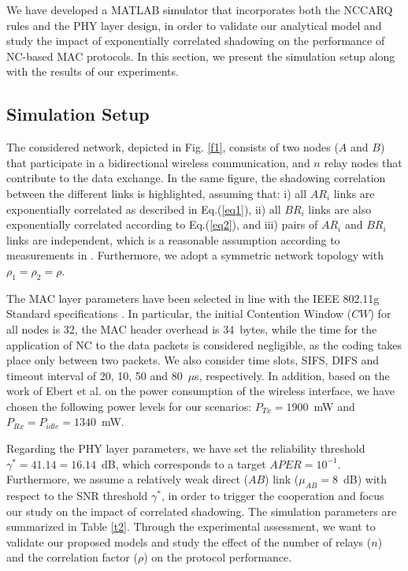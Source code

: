 \documentclass[12pt,draftcls, onecolumn]{IEEEtran}
\begin{document}
We have developed a MATLAB simulator that incorporates both the NCCARQ rules and the PHY layer design, in order to validate our analytical model and study the impact of exponentially correlated shadowing on the performance of NC-based MAC protocols. In this section, we present the simulation setup along with the results of our experiments.

\subsection{Simulation Setup}
\label{sec:setup}

The considered network, depicted in Fig. \ref{f1}, consists of two nodes ($A$ and $B$) that participate in a bidirectional wireless communication, and $n$ relay nodes that contribute to the data exchange. In the same figure, the shadowing correlation between the different links is highlighted, assuming that: i) all $AR_i$ links are exponentially correlated as described in Eq.(\ref{eq1}), ii) all $BR_i$ links are also exponentially correlated according to Eq.(\ref{eq2}), and iii) pairs of $AR_i$ and $BR_i$ links are independent, which is a reasonable assumption according to measurements in \cite{cor1}. Furthermore, we adopt a symmetric network topology with $\rho_1=\rho_2=\rho$.

The MAC layer parameters have been selected in line with the IEEE 802.11g Standard specifications \cite{80211std}. In particular, the initial Contention Window ($CW$) for all nodes is 32, the MAC header overhead is 34~bytes, while the time for the application of NC to the data packets is considered negligible, as the coding takes place only between two packets. We also consider time slots, SIFS, DIFS and timeout interval of 20, 10, 50 and 80~$\mu$s, respectively. In addition, based on the work of Ebert et al. \cite{ebert} on the power consumption of the wireless interface, we have chosen the following power levels for our scenarios: $P_{Tx}=1900$~mW and $P_{Rx}=P_{idle}=1340$~mW.

Regarding the PHY layer parameters, we have set the reliability threshold $\gamma^*=41.14=16.14$~dB, which corresponds to a target $APER=10^{-1}$. Furthermore, we assume a relatively weak direct ($AB$) link ($\mu_{AB}=8$~dB) with respect to the SNR threshold $\gamma^*$, in order to trigger the cooperation and focus our study on the impact of correlated shadowing. The simulation parameters are summarized in Table \ref{t2}. Through the experimental assessment, we want to validate our proposed models and study the effect of the number of relays ($n$) and the correlation factor ($\rho$) on the protocol performance.
\end{document}
